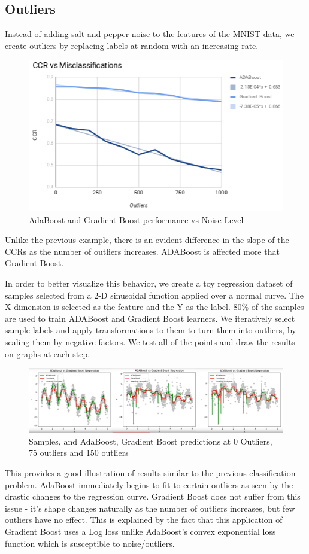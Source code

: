 \documentclass[10pt,twocolumn,letterpaper]{article}
\begin{document}
\subsection{Outliers}
Instead of adding salt and pepper noise to the features of the MNIST data, we create outliers by replacing labels at random with an increasing rate.
\begin{figure}[h!]
  \includegraphics[width=\linewidth]{fig3.png}
  \caption{AdaBoost and Gradient Boost performance vs Noise Level}
  \label{fig:c2}
\end{figure}
Unlike the previous example, there is an evident difference in the slope of the CCRs as the number of outliers increases. ADABoost is affected more that Gradient Boost.

In order to better visualize this behavior, we create a toy regression dataset of samples selected from a 2-D sinusoidal function applied over a normal curve. The X dimension is selected as the feature and the Y as the label. 80\% of the samples are used to train ADABoost and Gradient Boost learners. We iteratively select sample labels and apply transformations to them to turn them into outliers, by scaling them by negative factors. We test all of the points and draw the results on graphs at each step. 
\begin{figure}[h!]
  \includegraphics[width=\linewidth]{fig4.png}
  \caption{Samples, and AdaBoost, Gradient Boost predictions at 0 Outliers, 75 outliers and 150 outliers}
  \label{fig:c2}
\end{figure}
This provides a good illustration of results similar to the previous classification problem. AdaBoost immediately begins to fit to certain outliers as seen by the drastic changes to the regression curve. Gradient Boost does not suffer from this issue - it's shape changes naturally as the number of outliers increases, but few outliers have no effect. This is explained by the fact that this application of Gradient Boost uses a Log loss unlike AdaBoost's convex exponential loss function which is susceptible to noise/outliers.
\end{document}
